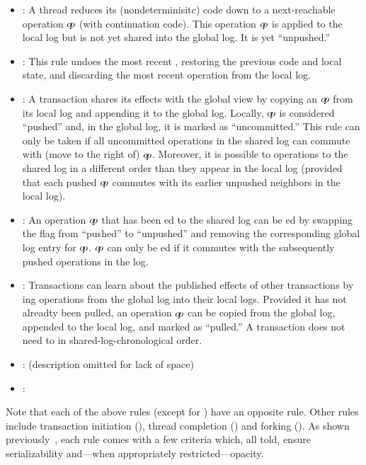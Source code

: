 \begin{itemize}
\item \APPLY: A thread reduces its (nondeterminisitc) code down to a
  next-reachable operation $o\!p$ (with continuation code). This
  operation $o\!p$ is applied to the local log but is not yet shared
  into the global log. It is yet ``unpushed.''

\item \UNAPP: This rule undoes the most recent \APPLY, restoring the
  previous code and local state, and discarding the most recent
  operation from the local log.

\item \PUSH: A transaction shares its effects with the global view by
  copying an $o\!p$ from its local log and appending it to the global
  log. Locally, $o\!p$ is considered ``pushed'' and, in the global log,
  it is marked as ``uncommitted.''
%
  This rule can only be taken if all uncommitted operations in the
  shared log can commute with (move to the right of) $o\!p$.
%
  Moreover, it is possible to \PUSH{} operations to the shared log in
  a different order than they appear in the local log (provided that
  each pushed $o\!p$ commutes with its earlier unpushed neighbors in the local log).

\item \UNPUSH: An operation $o\!p$ that has been \PUSH{}ed to the
  shared log can be \UNPUSH{}ed by swapping the flag from ``pushed''
  to ``unpushed'' and removing the corresponding global log entry for
  $o\!p$. $o\!p$ can only be \UNPUSH{}ed if it commutes with the
  subsequently pushed operations in the log.

\item \PULL:
%
  Transactions can learn about the published effects of other
  transactions by \PULL{}ing operations from the global log into their
  local logs. Provided it has not alreadty been pulled, an operation
  $o\!p$ can be copied from the global log, appended to the local log,
  and marked as ``pulled.'' A transaction does not need to \PULL{} in
  shared-log-chronological order.

\item \UNPULL: (description omitted for lack of space)

\item \CMT: 
\end{itemize}
Note that each of the above rules (except for \CMT) have an opposite rule.
%
Other rules include transaction initiation (\BEGIN),
thread completion (\FIN) and forking (\FORK).
As shown previously~\cite{KP:PLDI15}, each rule comes with a few
criteria which, all told, ensure serializability and---when
appropriately restricted---opacity.




